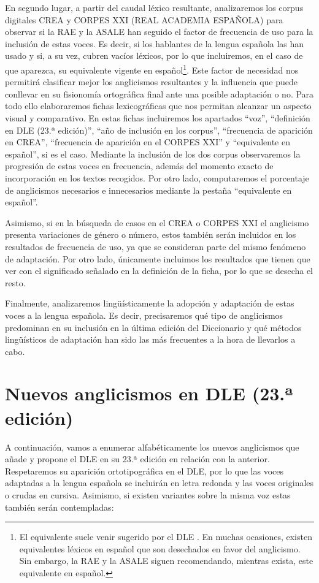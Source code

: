 \documentclass{textolivre}
\begin{document}
En segundo lugar, a partir del caudal léxico resultante, analizaremos los corpus digitales CREA y CORPES XXI (REAL ACADEMIA ESPAÑOLA) para observar si la RAE y la ASALE han seguido el factor de frecuencia de uso para la inclusión de estas voces. Es decir, si los hablantes de la lengua española las han usado y si, a su vez, cubren vacíos léxicos, por lo que incluiremos, en el caso de que aparezca, su equivalente vigente en español\footnote{
El equivalente suele venir sugerido por el DLE \cite{real2014diccionario}. En muchas ocasiones, existen equivalentes léxicos en español que son desechados en favor del anglicismo. Sin embargo, la RAE y la ASALE siguen recomendando, mientras exista, este equivalente en español.
}. Este factor de necesidad nos permitirá clasificar mejor los anglicismos resultantes y la influencia que puede conllevar en su fisionomía ortográfica final ante una posible adaptación o no. Para todo ello elaboraremos fichas lexicográficas que nos permitan alcanzar un aspecto visual y comparativo. En estas fichas incluiremos los apartados “voz”, “definición en DLE (23.ª edición)”, “año de inclusión en los corpus”, “frecuencia de aparición en CREA”, “frecuencia de aparición en el CORPES XXI” y “equivalente en español”, si es el caso. Mediante la inclusión de los dos corpus observaremos la progresión de estas voces en frecuencia, además del momento exacto de incorporación en los textos recogidos. Por otro lado, computaremos el porcentaje de anglicismos necesarios e innecesarios mediante la pestaña “equivalente en español”.

Asimismo, si en la búsqueda de casos en el CREA o CORPES XXI el anglicismo presenta variaciones de género o número, estos también serán incluidos en los resultados de frecuencia de uso, ya que se consideran parte del mismo fenómeno de adaptación. Por otro lado, únicamente incluimos los resultados que tienen que ver con el significado señalado en la definición de la ficha, por lo que se desecha el resto.

Finalmente, analizaremos lingüísticamente la adopción y adaptación de estas voces a la lengua española. Es decir, precisaremos qué tipo de anglicismos predominan en su inclusión en la última edición del Diccionario y qué métodos lingüísticos de adaptación han sido las más frecuentes a la hora de llevarlos a cabo.



\section{Nuevos anglicismos en DLE (23.ª edición)}\label{sec-anglicismos}
A continuación, vamos a enumerar alfabéticamente los nuevos anglicismos que añade y propone el DLE en su 23.ª edición en relación con la anterior. Respetaremos su aparición ortotipográfica en el DLE, por lo que las voces adaptadas a la lengua española se incluirán en letra redonda y las voces originales o crudas en cursiva. Asimismo, si existen variantes sobre la misma voz estas también serán contempladas:
\end{document}
